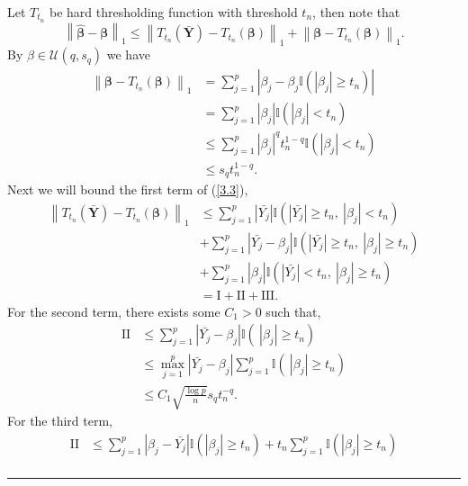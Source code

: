 \documentclass[12pt]{article}
\numberwithin{equation}{section}
\newenvironment{proof}{{\bf Proof:}}{\hfill\rule{2mm}{2mm}}
\begin{document}
\begin{proof}
	Let $T_{t_n}$ be hard thresholding function with threshold $t_n$, then note that
	\begin{equation}\label{3.3}
		\left\|\boldsymbol{\widehat\beta}-\boldsymbol{\beta}\right\|_1\leq 	\left\|T_{t_n}\left(\boldsymbol{\bar Y}\right)-T_{t_n}\left(\boldsymbol{\beta}\right)\right\|_1+\left\|\boldsymbol{\beta}-T_{t_n}\left(\boldsymbol{\beta}\right)\right\|_1.
	\end{equation}
	By $\beta\in \mathcal{U}\left(q,s_q\right)$ we have
	\begin{align*}
		\left\|\boldsymbol{\beta}-T_{t_n}\left(\boldsymbol{\beta}\right)\right\|_1&=\sum_{j=1}^p\left|\beta_{j}-\beta_{j}\mathbb{I}\left(|\beta_{j}|\geq t_n\right)\right|\\
		&=\sum_{j=1}^p\left|\beta_{j}\right|\mathbb{I}\left(|\beta_{j}|< t_n\right)\\
		&\leq \sum_{j=1}^p\left|\beta_{j}\right|^qt_n^{1-q}\mathbb{I}\left(|\beta_{j}|< t_n\right)\\
		&\leq s_qt_n^{1-q}.
	\end{align*}
	Next we will bound the first term of (\ref{3.3}),
	\begin{align*}
	\left\|T_{t_n}\left(\boldsymbol{\bar Y}\right)-T_{t_n}\left(\boldsymbol{\beta}\right)\right\|_1
	&\leq \sum_{j=1}^p\left|\bar{Y_j}\right|\mathbb{I}\left(|\bar{Y_j}|\geq t_n,\ |\beta_{j}|< t_n\right)\\
	&+\sum_{j=1}^p\left|\bar{Y_j}-\beta_{j}\right|\mathbb{I}\left(|\bar{Y_j}|\geq t_n,\ |\beta_{j}|\geq t_n\right)\\
	&+\sum_{j=1}^p\left|\beta_{j}\right|\mathbb{I}\left(|\bar{Y_j}|< t_n,\ |\beta_{j}|\geq t_n\right)\\
	&=\mathrm{I}+\mathrm{II}+\mathrm{III}.
	\end{align*}
	For the second term, there exists some $C_1>0$ such that,
	\begin{align*}
	\mathrm{II}&\leq \sum_{j=1}^p\left|\bar{Y_j}-\beta_{j}\right|\mathbb{I}\left(\ |\beta_{j}|\geq  t_n\right)\\
	&\leq \max_{j=1}^p\left|\bar{Y_j}-\beta_{j}\right|\sum_{j=1}^p\mathbb{I}\left(\ |\beta_{j}|\geq t_n\right)\\
	&\leq C_1\sqrt{\frac{\log p}{n}}s_qt_n^{-q}.
	\end{align*}
	For the third term,
	\begin{align*}
	\mathrm{II}&\leq \sum_{j=1}^p\left|\beta_{j}-\bar{Y_j}\right|\mathbb{I}\left( |\beta_{j}|\geq t_n\right)+t_n\sum_{j=1}^p\mathbb{I}\left(|\beta_{j}|\geq t_n\right)\\

\end{align*}
\end{proof}
\end{document}
